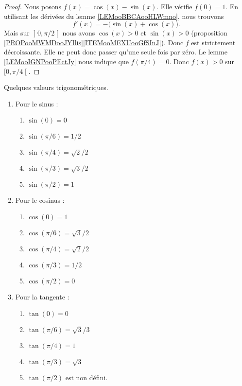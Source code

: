 \begin{proof}
	Nous posons \( f(x)=\cos(x)-\sin(x)\). Elle vérifie \( f(0)=1\). En utilisant les dérivées du lemme \ref{LEMooBBCAooHLWmno}, nous trouvons
	\begin{equation}
		f'(x)=-\big( \sin(x)+\cos(x) \big).
	\end{equation}
	Mais sur \( \mathopen] 0 , \pi/2 \mathclose[\) nous avons \( \cos(x)>0\) et \( \sin(x)>0\) (proposition \ref{PROPooMWMDooJYIlis}\ref{ITEMooMEXUooGfSInJ}). Donc \( f\) est strictement décroissante. Elle ne peut donc passer qu'une seule fois par zéro. Le lemme \ref{LEMooIGNPooPEctJy} nous indique que \( f(\pi/4)=0\). Donc \( f(x)>0\) sur \( \mathopen[ 0 , \pi/4 \mathclose[\).
\end{proof}

\begin{proposition}		\label{PROPooIBYEooClQttq}
	Quelques valeurs trigonométriques.
	\begin{multicols}{2}
		\begin{enumerate}
			\item
			      Pour le sinus :
			      \begin{enumerate}
				      \item
				            \( \sin(0)=0\)
				      \item
				            \( \sin(\pi/6)=1/2\)
				      \item
				            \( \sin(\pi/4)=\sqrt{ 2 }/2\)
				      \item
				            \( \sin(\pi/3)=\sqrt{ 3 }/2\)
				      \item
				            \( \sin(\pi/2)=1\)
			      \end{enumerate}

			\item
			      Pour le cosinus :
			      \begin{enumerate}
				      \item
				            \( \cos(0)=1\)
				      \item
				            \( \cos(\pi/6)=\sqrt{ 3 }/2\)
				      \item
				            \( \cos(\pi/4)=\sqrt{ 2 }/2\)
				      \item
				            \( \cos(\pi/3)=1/2\)
				      \item
				            \( \cos(\pi/2)=0\)
			      \end{enumerate}
			\item
			      Pour la tangente :
			      \begin{enumerate}
				      \item
				            \( \tan(0)=0\)
				      \item
				            \( \tan(\pi/6)=\sqrt{ 3 }/3\)
				      \item
				            \( \tan(\pi/4)=1\)
				      \item
				            \( \tan(\pi/3)=\sqrt{ 3 }\)
				      \item
				            \( \tan(\pi/2)\) est non défini.
			      \end{enumerate}
		\end{enumerate}
	\end{multicols}
\end{proposition}

